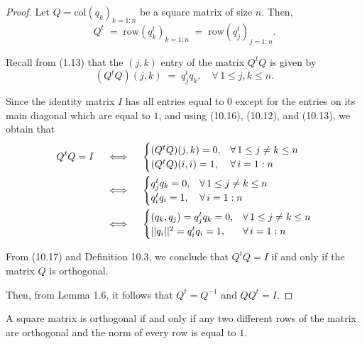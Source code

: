 \begin{proof}
Let $Q = \mathrm{col}(q_k)_{k=1:n}$ be a square matrix of size $n$. Then,
\[
Q^t \;=\; \mathrm{row}\left(q_k^t\right)_{k=1:n} \;=\; \mathrm{row}\left(q_j^t\right)_{j=1:n}.
\]

Recall from (1.13) that the $(j,k)$ entry of the matrix $Q^tQ$ is given by
\begin{equation}
(Q^tQ)(j,k) \;=\; q_j^tq_k, \quad \forall\, 1 \le j,k \le n.
\end{equation}

Since the identity matrix $I$ has all entries equal to $0$ except for the entries on
its main diagonal which are equal to $1$, and using (10.16), (10.12), and (10.13), we
obtain that
\begin{align}
Q^tQ = I \quad &\iff \quad
\begin{cases}
(Q^tQ)(j,k) = 0, & \forall\, 1 \le j \ne k \le n \\
(Q^tQ)(i,i) = 1, & \forall\, i = 1:n
\end{cases} \notag \\
&\iff \quad
\begin{cases}
q_j^tq_k = 0, & \forall\, 1 \le j \ne k \le n \\
q_i^tq_i = 1, & \forall\, i = 1:n
\end{cases} \notag \\
&\iff \quad
\begin{cases}
(q_k,q_j) = q_j^tq_k = 0, & \forall\, 1 \le j \ne k \le n \\
||q_i||^2 = q_i^tq_i = 1, & \forall\, i = 1:n
\end{cases}
\end{align}

From (10.17) and Definition 10.3, we conclude that $Q^tQ = I$ if and only if the
matrix $Q$ is orthogonal.

Then, from Lemma 1.6, it follows that $Q^t = Q^{-1}$ and $QQ^t = I$.
\end{proof}

\begin{lemma}
A square matrix is orthogonal if and only if any two different rows of the matrix are
orthogonal and the norm of every row is equal to $1$.
\end{lemma}

